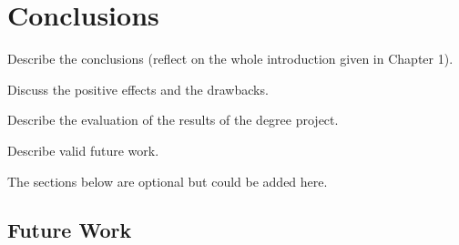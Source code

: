\documentclass[/home/francois/latex/report/main.tex]{subfiles}
\begin{document}
\chapter{Conclusions}
Describe the conclusions (reflect on the whole introduction given in Chapter 1).

Discuss the positive effects and the drawbacks.

Describe the evaluation of the results of the degree project.

Describe valid future work.

The sections below are optional but could be added here.

\section{Future Work}
\end{document}
